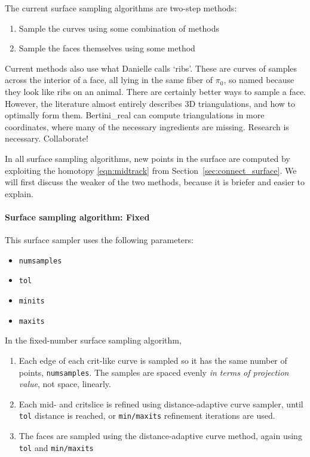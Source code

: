 The current surface sampling algorithms are two-step methods:
\begin{enumerate}
\item Sample the curves using some combination of methods
\item Sample the faces themselves using some method
\end{enumerate}



Current methods also use what Danielle calls `ribs'.  These are curves of samples across the interior of a face, all lying in the same fiber of $\pi_0$, so named because they look like ribs on an animal.  There are certainly better ways to sample a face.  However, the literature almost entirely describes 3D triangulations, and how to optimally form them.  Bertini\_real can compute triangulations in more coordinates, where many of the necessary ingredients are missing.  Research is necessary.  Collaborate!

In all surface sampling algorithms, new points in the surface are computed by exploiting the homotopy \eqref{eqn:midtrack} from Section~\ref{sec:connect_surface}.  We will first discuss the weaker of the two methods, because it is briefer and easier to explain.












\paragraph{Surface sampling algorithm: Fixed}

This surface sampler uses the following parameters:
\begin{itemize}[noitemsep]
\item {\tt numsamples}
\item {\tt tol}
\item {\tt minits}
  \item {\tt maxits}
\end{itemize}

In the fixed-number surface sampling algorithm, 
\begin{enumerate}
\item Each edge of each crit-like curve is sampled so it has the same number of points, {\tt numsamples}.  The samples are spaced evenly {\em in terms of projection value}, not space, linearly.  

\item Each mid- and critslice is refined using distance-adaptive curve sampler, until {\tt tol} distance is reached, or {\tt min/maxits} refinement iterations are used.

\item The faces are sampled using the distance-adaptive curve method, again using {\tt tol} and {\tt min/maxits}
\end{enumerate}

